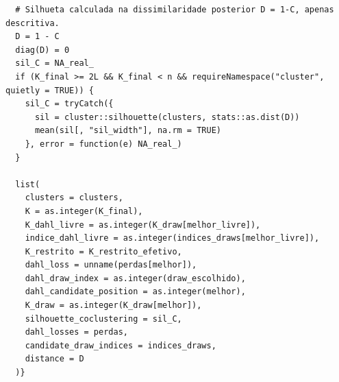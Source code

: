 \begin{verbatim}
  # Silhueta calculada na dissimilaridade posterior D = 1-C, apenas descritiva.
  D = 1 - C
  diag(D) = 0
  sil_C = NA_real_
  if (K_final >= 2L && K_final < n && requireNamespace("cluster", quietly = TRUE)) {
    sil_C = tryCatch({
      sil = cluster::silhouette(clusters, stats::as.dist(D))
      mean(sil[, "sil_width"], na.rm = TRUE)
    }, error = function(e) NA_real_)
  }
  
  list(
    clusters = clusters,
    K = as.integer(K_final),
    K_dahl_livre = as.integer(K_draw[melhor_livre]),
    indice_dahl_livre = as.integer(indices_draws[melhor_livre]),
    K_restrito = K_restrito_efetivo,
    dahl_loss = unname(perdas[melhor]),
    dahl_draw_index = as.integer(draw_escolhido),
    dahl_candidate_position = as.integer(melhor),
    K_draw = as.integer(K_draw[melhor]),
    silhouette_coclustering = sil_C,
    dahl_losses = perdas,
    candidate_draw_indices = indices_draws,
    distance = D
  )}
\end{verbatim}